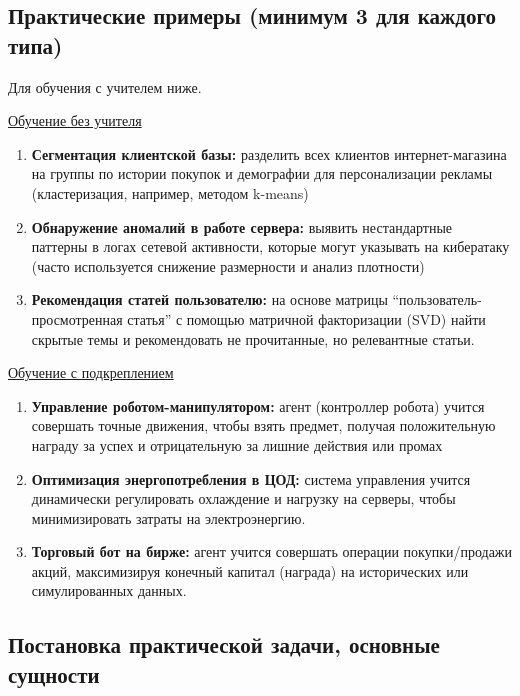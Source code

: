 \subsection{Практические примеры (минимум 3 для каждого типа)}

Для обучения с учителем ниже.

\underline{Обучение без учителя}
\begin{enumerate}
    \item \textbf{Сегментация клиентской базы:} разделить всех клиентов интернет-магазина на группы по истории
    покупок и демографии для персонализации рекламы (кластеризация, например, методом k-means)
    \item \textbf{Обнаружение аномалий в работе сервера:} выявить нестандартные паттерны в логах сетевой
    активности, которые могут указывать на кибератаку (часто используется снижение размерности и анализ плотности)
    \item \textbf{Рекомендация статей пользователю:} на основе матрицы ``пользователь-просмотренная статья'' с
    помощью матричной факторизации (SVD) найти скрытые темы и рекомендовать не прочитанные, но релевантные статьи.
\end{enumerate}

\underline{Обучение с подкреплением}
\begin{enumerate}
    \item \textbf{Управление роботом-манипулятором:} агент (контроллер робота) учится совершать точные движения,
    чтобы взять предмет, получая положительную награду за успех и отрицательную за лишние действия или промах
    \item \textbf{Оптимизация энергопотребления в ЦОД:} система управления учится динамически регулировать
    охлаждение и нагрузку на серверы, чтобы минимизировать затраты на электроэнергию.
    \item \textbf{Торговый бот на бирже:} агент учится совершать операции покупки/продажи акций, максимизируя
    конечный капитал (награда) на исторических или симулированных данных.
\end{enumerate}

\subsection{Постановка практической задачи, основные сущности}

